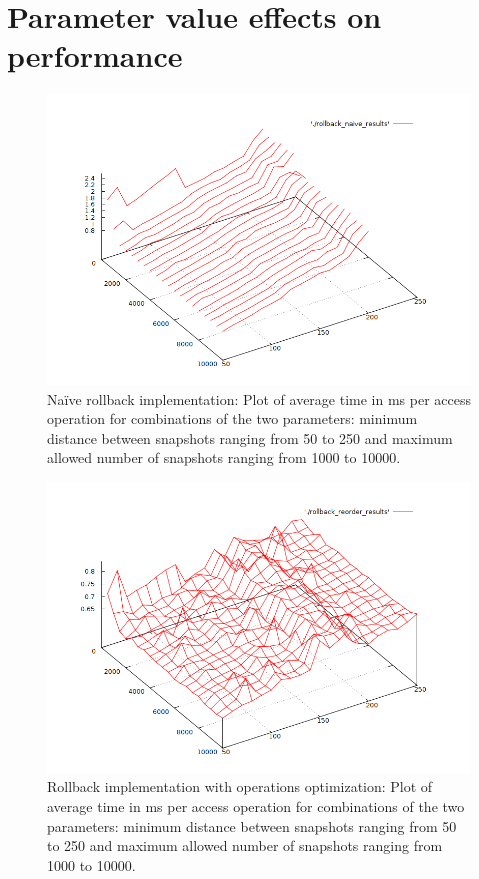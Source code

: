 \section{Parameter value effects on performance}
\begin{figure}[!hbp]
    \includegraphics[width=\textwidth]{figures/rollback_naive_results_plot.png}
    \caption{Na\"ive rollback implementation: Plot of average time in ms per
    access operation for combinations of the two parameters: minimum distance
    between snapshots ranging from 50 to 250 and maximum allowed number of
    snapshots ranging from 1000 to 10000.}
    \label{fig:rollback_naive_results_plot.png}
\end{figure}

\begin{figure}[!hbp]
    \includegraphics[width=\textwidth]{figures/rollback_reorder_results_plot.png}
    \caption{Rollback implementation with operations optimization: Plot of
    average time in ms per access operation for combinations of the two
    parameters: minimum distance between snapshots ranging from 50 to 250 and
    maximum allowed number of snapshots ranging from 1000 to 10000.}
    \label{fig:rollback_reorder_results_plot.png}
\end{figure}

